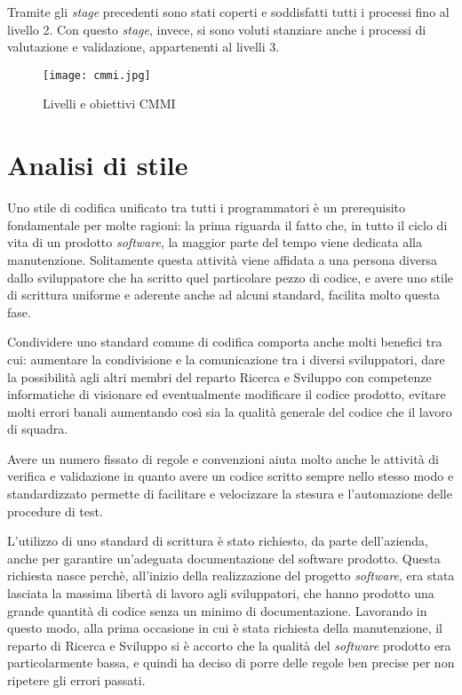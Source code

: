 Tramite gli \textit{stage} precedenti sono stati coperti e soddisfatti tutti i processi fino al livello 2. Con questo \textit{stage}, invece, si sono voluti stanziare anche i processi di valutazione e validazione, appartenenti al livelli 3.

\begin{figure}[H]
  \centering
  \texttt{[image: cmmi.jpg]}
  \caption{Livelli e obiettivi CMMI}
\end{figure}

\section{Analisi di stile}

Uno stile di codifica unificato tra tutti i programmatori è un prerequisito fondamentale per molte ragioni: la prima  riguarda il fatto che, in tutto il ciclo di vita di un prodotto \textit{software}, la maggior parte del tempo viene dedicata alla manutenzione. Solitamente questa attività viene affidata a una persona diversa dallo sviluppatore che ha scritto quel particolare pezzo di codice, e avere uno stile di scrittura uniforme e aderente anche ad alcuni standard, facilita molto questa fase.

Condividere uno standard comune di codifica comporta anche molti benefici tra cui: aumentare la condivisione e la comunicazione tra i diversi sviluppatori, dare la possibilità agli altri membri del reparto Ricerca e Sviluppo con competenze informatiche di visionare ed eventualmente modificare il codice prodotto, evitare molti errori banali aumentando così sia la qualità generale del codice che il lavoro di squadra.

Avere un numero fissato di regole e convenzioni aiuta molto anche le attività di verifica e validazione in quanto avere un codice scritto sempre nello stesso modo e standardizzato permette di facilitare e velocizzare la stesura e l'automazione delle procedure di test.

L'utilizzo di uno standard di scrittura è stato richiesto, da parte dell'azienda, anche per garantire un'adeguata documentazione del software prodotto. Questa richiesta nasce perchè, all'inizio della realizzazione del progetto \textit{software}, era stata lasciata la massima libertà di lavoro agli sviluppatori, che hanno prodotto una grande quantità di codice senza un minimo di documentazione. Lavorando in questo modo, alla prima occasione in cui è stata richiesta della manutenzione, il reparto di Ricerca e Sviluppo si è accorto che la qualità del \textit{software} prodotto era particolarmente bassa, e quindi ha deciso di porre delle regole ben precise per non ripetere gli errori passati.

